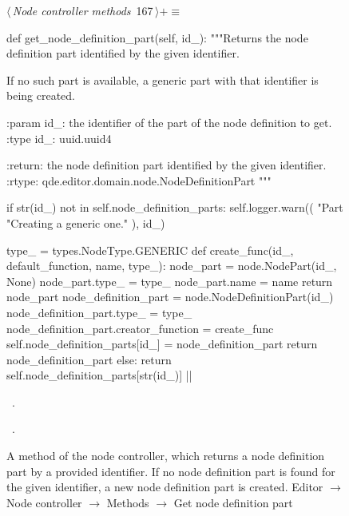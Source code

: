 \documentclass[%
    a4paper,    %
    justified,  %
    nobib,      %
    openany     %
]{tufte-book}
\makeatletter
\renewcommand{\label}[1]{\@tufte@label{##1}}%
\makeatother
\begin{document}
\begin{figure}[!htbp]
\begin{flushleft} \small
\begin{minipage}{\linewidth}\label{scrap134}\raggedright\small
{} $\langle\,${\itshape Node controller methods}\nobreak\ {\footnotesize {167}}$\,\rangle+\equiv$
\vspace{-1ex}
\begin{pythoncode}
def get_node_definition_part(self, id_):
    """Returns the node definition part identified by the given
    identifier.

    If no such part is available, a generic part with that
    identifier is being created.

    :param id_: the identifier of the part of the node definition
                to get.
    :type  id_: uuid.uuid4

    :return: the node definition part identified by the given
             identifier.
    :rtype: qde.editor.domain.node.NodeDefinitionPart
    """

    if str(id_) not in self.node_definition_parts:
        self.logger.warn((
            "Part %
            "Creating a generic one."
        ), id_)

        type_ = types.NodeType.GENERIC
        def create_func(id_, default_function, name, type_):
            node_part = node.NodePart(id_, None)
            node_part.type_ = type_
            node_part.name = name
            return node_part
        node_definition_part = node.NodeDefinitionPart(id_)
        node_definition_part.type_ = type_
        node_definition_part.creator_function = create_func
        self.node_definition_parts[id_] = node_definition_part
        return node_definition_part
    else:
        return self.node_definition_parts[str(id_)]
|\NWsep|
\end{pythoncode}
\vspace{1.5ex}
\footnotesize
\begin{list}{}{\setlength{\itemsep}{-\parsep}\setlength{\itemindent}{-\leftmargin}}
\item \NWtxtMacroDefBy\ .
\item \NWtxtMacroRefIn\ .

\item{}
\end{list}
\end{minipage}\vspace{4ex}
\end{flushleft}
\caption{A method of the node controller, which returns a node definition part
  by a provided identifier. If no node definition part is found for the given
  identifier, a new node definition part is created.
  \newline{}\newline{}Editor $\rightarrow$ Node controller $\rightarrow$
  Methods $\rightarrow$ Get node definition part}
\end{figure}
\end{document}
